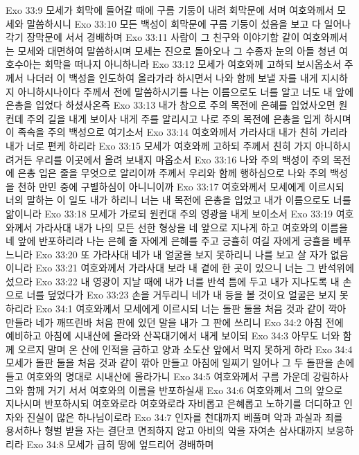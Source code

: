 Exo 33:9  모세가 회막에 들어갈 때에 구름 기둥이 내려 회막문에 서며 여호와께서 모세와 말씀하시니
Exo 33:10  모든 백성이 회막문에 구름 기둥이 섰음을 보고 다 일어나 각기 장막문에 서서 경배하며
Exo 33:11  사람이 그 친구와 이야기함 같이 여호와께서는 모세와 대면하여 말씀하시며 모세는 진으로 돌아오나 그 수종자 눈의 아들 청년 여호수아는 회막을 떠나지 아니하니라
Exo 33:12  모세가 여호와께 고하되 보시옵소서 주께서 나더러 이 백성을 인도하여 올라가라 하시면서 나와 함께 보낼 자를 내게 지시하지 아니하시나이다 주께서 전에 말씀하시기를 나는 이름으로도 너를 알고 너도 내 앞에 은총을 입었다 하셨사온즉
Exo 33:13  내가 참으로 주의 목전에 은혜를 입었사오면 원컨데 주의 길을 내게 보이사 내게 주를 알리시고 나로 주의 목전에 은총을 입게 하시며 이 족속을 주의 백성으로 여기소서
Exo 33:14  여호와께서 가라사대 내가 친히 가리라 내가 너로 편케 하리라
Exo 33:15  모세가 여호와께 고하되 주께서 친히 가지 아니하시려거든 우리를 이곳에서 올려 보내지 마옵소서
Exo 33:16  나와 주의 백성이 주의 목전에 은총 입은 줄을 무엇으로 알리이까 주께서 우리와 함께 행하심으로 나와 주의 백성을 천하 만민 중에 구별하심이 아니니이까
Exo 33:17  여호와께서 모세에게 이르시되 너의 말하는 이 일도 내가 하리니 너는 내 목전에 은총을 입었고 내가 이름으로도 너를 앎이니라
Exo 33:18  모세가 가로되 원컨대 주의 영광을 내게 보이소서
Exo 33:19  여호와께서 가라사대 내가 나의 모든 선한 형상을 네 앞으로 지나게 하고 여호와의 이름을 네 앞에 반포하리라 나는 은혜 줄 자에게 은혜를 주고 긍휼히 여길 자에게 긍휼을 베푸느니라
Exo 33:20  또 가라사대 네가 내 얼굴을 보지 못하리니 나를 보고 살 자가 없음이니라
Exo 33:21  여호와께서 가라사대 보라 내 곁에 한 곳이 있으니 너는 그 반석위에 섰으라
Exo 33:22  내 영광이 지날 때에 내가 너를 반석 틈에 두고 내가 지나도록 내 손으로 너를 덮었다가
Exo 33:23  손을 거두리니 네가 내 등을 볼 것이요 얼굴은 보지 못하리라
Exo 34:1  여호와께서 모세에게 이르시되 너는 돌판 둘을 처음 것과 같이 깍아 만들라 네가 깨뜨린바 처음 판에 있던 말을 내가 그 판에 쓰리니
Exo 34:2  아침 전에 예비하고 아침에 시내산에 올라와 산꼭대기에서 내게 보이되
Exo 34:3  아무도 너와 함께 오르지 말며 온 산에 인적을 금하고 양과 소도산 앞에서 먹지 못하게 하라
Exo 34:4  모세가 돌판 둘을 처음 것과 같이 깎아 만들고 아침에 일찌기 일어나 그 두 돌판을 손에 들고 여호와의 명대로 시내산에 올라가니
Exo 34:5  여호와께서 구름 가운데 강림하사 그와 함께 거기 서서 여호와의 이름을 반포하실새
Exo 34:6  여호와께서 그의 앞으로 지나시며 반포하시되 여호와로라 여호와로라 자비롭고 은혜롭고 노하기를 더디하고 인자와 진실이 많은 하나님이로라
Exo 34:7  인자를 천대까지 베풀며 악과 과실과 죄를 용서하나 형벌 받을 자는 결단코 면죄하지 않고 아비의 악을 자여손 삼사대까지 보응하리라
Exo 34:8  모세가 급히 땅에 엎드리어 경배하며
